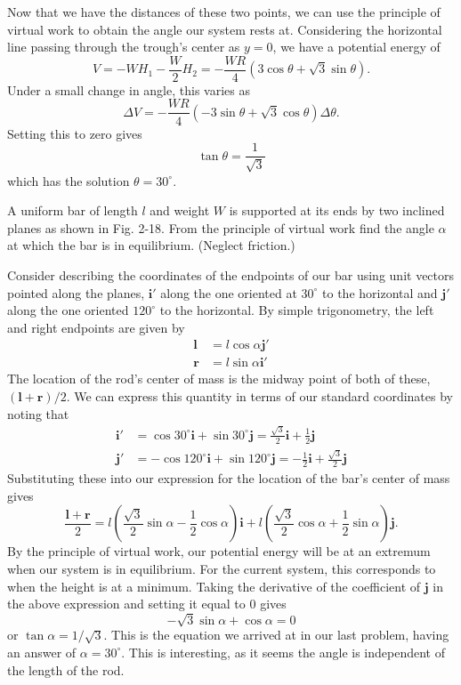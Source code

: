 \documentclass[../feynman-lectures-on-physics.tex]{subfiles}
\begin{document}
\begin{questions}
\begin{solution}
	Now that we have the distances of these two points, we can use the principle of virtual work to obtain the angle our system rests at. Considering the horizontal line passing through the trough's center as $y = 0$, we have a potential energy of
	\[
	V = -WH_1 - \frac{W}{2}H_2 = -\frac{WR}{4}(3\cos\theta + \sqrt{3}\sin\theta).
	\] 
	Under a small change in angle, this varies as
	\[
	\Delta{V} = -\frac{WR}{4}(-3\sin\theta + \sqrt{3}\cos\theta)\Delta\theta.
	\] 
	Setting this to zero gives
	\[
	\tan\theta = \frac{1}{\sqrt{3}}
	\] 
	which has the solution $\theta = 30^\circ$.
\end{solution}

\question A uniform bar of length $l$ and weight $W$ is supported at its ends by two inclined planes as shown in Fig. 2-18. From the principle of virtual work find the angle $\alpha$ at which the bar is in equilibrium. (Neglect friction.)

\begin{solution}
	Consider describing the coordinates of the endpoints of our bar using unit vectors pointed along the planes, $\mathbf{i}'$ along the one oriented at $30^\circ$ to the horizontal and $\mathbf{j}'$ along the one oriented $120^\circ$ to the horizontal. By simple trigonometry, the left and right endpoints are given by
	\begin{align}
		\mathbf{l} &= l\cos\alpha\mathbf{j}' \\
		\mathbf{r} &= l\sin\alpha\mathbf{i}'
	\end{align}
	The location of the rod's center of mass is the midway point of both of these, $(\mathbf{l} + \mathbf{r})/2$. We can express this quantity in terms of our standard coordinates by noting that
	\begin{align}
		\mathbf{i}' &= \cos{30^\circ}\mathbf{i} + \sin{30^\circ}\mathbf{j} = \frac{\sqrt{3}}{2}\mathbf{i} + \frac{1}{2}\mathbf{j} \\
		\mathbf{j}' &= -\cos{120^\circ}\mathbf{i} + \sin{120^\circ}\mathbf{j} = -\frac{1}{2}\mathbf{i} + \frac{\sqrt{3}}{2}\mathbf{j}
	\end{align}
	Substituting these into our expression for the location of the bar's center of mass gives
	\[
	\frac{\mathbf{l} + \mathbf{r}}{2} = l(\frac{\sqrt{3}}{2}\sin\alpha - \frac{1}{2}\cos\alpha)\mathbf{i} + l(\frac{\sqrt{3}}{2}\cos\alpha + \frac{1}{2}\sin\alpha)\mathbf{j}.
	\] 
	By the principle of virtual work, our potential energy will be at an extremum when our system is in equilibrium. For the current system, this corresponds to when the height is at a minimum. Taking the derivative of the coefficient of $\mathbf{j}$ in the above expression and setting it equal to $0$ gives
	\[
	-\sqrt{3}\sin\alpha + \cos\alpha = 0
	\] 
	or $\tan\alpha = 1/\sqrt{3}$. This is the equation we arrived at in our last problem, having an answer of $\alpha = 30^\circ$. This is interesting, as it seems the angle is independent of the length of the rod.
\end{solution}


\end{questions}
\end{document}
